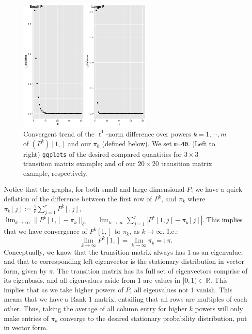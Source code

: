 \documentclass [10pt] {article}
\newcommand{\R}{\mathbb{R}}
\newcommand{\ds}{\displaystyle}
\begin{document}
\begin{enumerate}
\begin{figure}[h]
    \centering
    \includegraphics[width=0.6\textwidth]{problem1.png}
    \caption{Convergent trend of the $\ell^1$-norm difference over powers $k=1,\cdots,m$ of $(P^k)[1,]$ and our $\pi_k$ (defined below). We set \texttt{m=40}. (Left to right) \texttt{ggplots} of the desired compared quantities for $3\times3$ transition matrix example; and of our $20\times20$ transition matrix example, respectively.}
\end{figure}

Notice that the graphs, for both small and large dimensional $P$, we have a quick deflation of the difference between the first row of $P^k$, and $\pi_k$ where $\ds\pi_k[j]:=\frac{1}{r}\sum_{j=1}^rP^k[,j]$, $\ds\lim_{k\to\infty}\|P^k[1,]-\pi_k\|_{\ell^1}=\lim_{k\to\infty}\sum_{j=1}^r\left|P^k[1,j]-\pi_k[j]\right|$. This implies that we have convergence of $P^k[1,]$ to $\pi_k$, as $k\to\infty$. I.e.:
$$\lim_{k\to\infty}P^k[1,]=\lim_{k\to\infty}\pi_k=:\pi.$$
Conceptually, we know that the transition matrix always has 1 as an eigenvalue, and that te corresponding left eigenvector is the stationary distribution in vector form, given by $\pi$. The transition matrix has its full set of eigenvectors comprise of its eigenbasis, and all eigenvalues aside from 1 are values in $[0,1)\subset\R$. This implies that as we take higher powers of $P$, all eigenvalues not 1 vanish. This means that we have a Rank 1 matrix, entailing that all rows are multiples of each other. Thus, taking the average of all column entry for higher $k$ powers will only make entries of $\pi_k$ converge to the desired stationary probability distribution, put in vector form.


\end{enumerate}
\end{document}
